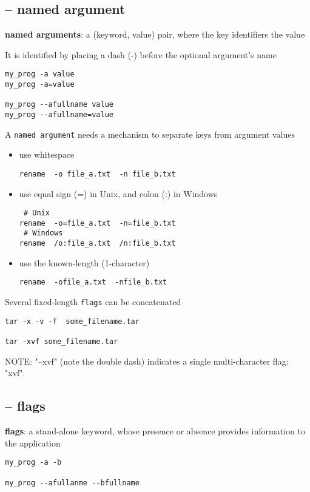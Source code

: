 \subsection{-- named argument}
\label{sec:named-argument}
{\bf named arguments}: a (keyword, value) pair, where the key
  identifiers the value
  
  It is  identified by placing a dash (-) before the optional argument's name
\begin{verbatim}
my_prog -a value
my_prog -a=value

my_prog --afullname value
my_prog --afullname=value
\end{verbatim}  
% 

A \verb!named argument! needs a mechanism to separate keys from argument values
\begin{itemize}
  \item use whitespace 
\begin{verbatim}
rename  -o file_a.txt  -n file_b.txt
\end{verbatim}  

  \item use equal sign (=) in Unix, and colon (:) in Windows
\begin{verbatim}
 # Unix
rename  -o=file_a.txt  -n=file_b.txt
 # Windows
rename  /o:file_a.txt  /n:file_b.txt
\end{verbatim}

  \item use the known-length (1-character)
  
\begin{verbatim}
rename  -ofile_a.txt  -nfile_b.txt
\end{verbatim}
\end{itemize}

Several fixed-length \verb!flags! can be concatenated
\begin{verbatim}
tar -x -v -f  some_filename.tar

tar -xvf some_filename.tar
\end{verbatim}
NOTE: "--xvf" (note the double dash) indicates a single multi-character flag: "xvf".

\subsection{-- flags}
\label{sec:flags-in-argument}

{\bf flags}: a stand-alone keyword, whose presence or absence provides
  information to the application
\begin{verbatim}
my_prog -a -b

my_prog --afullanme --bfullname
\end{verbatim}  


